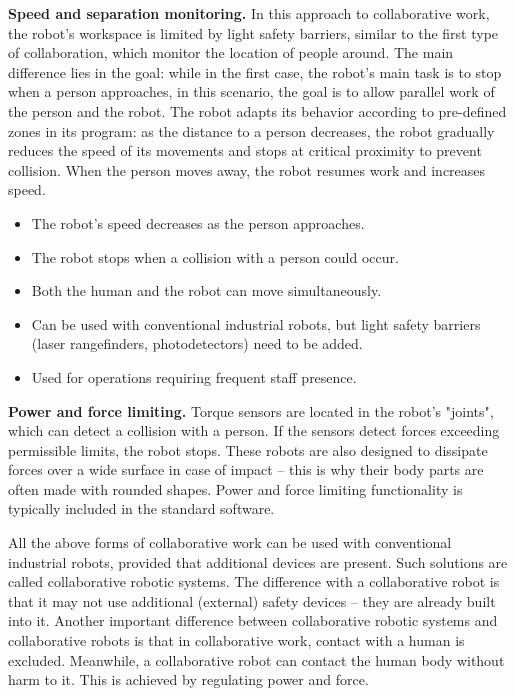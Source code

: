 \textbf{Speed and separation monitoring.}
In this approach to collaborative work, the robot's workspace is limited by light safety barriers, similar to the first type of collaboration, which monitor the location of people around. The main difference lies in the goal: while in the first case, the robot's main task is to stop when a person approaches, in this scenario, the goal is to allow parallel work of the person and the robot. The robot adapts its behavior according to pre-defined zones in its program: as the distance to a person decreases, the robot gradually reduces the speed of its movements and stops at critical proximity to prevent collision. When the person moves away, the robot resumes work and increases speed.
\begin{itemize}
	\item The robot's speed decreases as the person approaches.
	\item The robot stops when a collision with a person could occur.
	\item Both the human and the robot can move simultaneously.
	\item Can be used with conventional industrial robots, but light safety barriers (laser rangefinders, photodetectors) need to be added.
	\item Used for operations requiring frequent staff presence.
\end{itemize}

\textbf{Power and force limiting.} Torque sensors are located in the robot's "joints", which can detect a collision with a person. If the sensors detect forces exceeding permissible limits, the robot stops. These robots are also designed to dissipate forces over a wide surface in case of impact – this is why their body parts are often made with rounded shapes. Power and force limiting functionality is typically included in the standard software.

All the above forms of collaborative work can be used with conventional industrial robots, provided that additional devices are present. Such solutions are called collaborative robotic systems. The difference with a collaborative robot is that it may not use additional (external) safety devices – they are already built into it. Another important difference between collaborative robotic systems and collaborative robots is that in collaborative work, contact with a human is excluded. Meanwhile, a collaborative robot can contact the human body without harm to it. This is achieved by regulating power and force.

